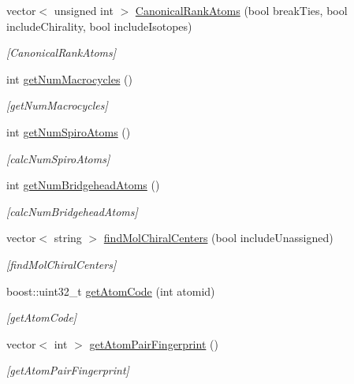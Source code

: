 \begin{DoxyCompactItemize}
vector$<$ unsigned int $>$ \mbox{\hyperlink{class_molecule_abc491241d48487fac42166ff81c0289c}{Canonical\+Rank\+Atoms}} (bool break\+Ties, bool include\+Chirality, bool include\+Isotopes)
\begin{DoxyCompactList}\small\item\em \mbox{[}Canonical\+Rank\+Atoms\mbox{]} \end{DoxyCompactList}\item 
int \mbox{\hyperlink{class_molecule_a7ae4c6e9458d7874bf43bdfbe079d875}{get\+Num\+Macrocycles}} ()
\begin{DoxyCompactList}\small\item\em \mbox{[}get\+Num\+Macrocycles\mbox{]} \end{DoxyCompactList}\item 
int \mbox{\hyperlink{class_molecule_ab418ce9c2222f00552c847a14499e282}{get\+Num\+Spiro\+Atoms}} ()
\begin{DoxyCompactList}\small\item\em \mbox{[}calc\+Num\+Spiro\+Atoms\mbox{]} \end{DoxyCompactList}\item 
int \mbox{\hyperlink{class_molecule_a9d22135d69888e8d269ac5384a424f83}{get\+Num\+Bridgehead\+Atoms}} ()
\begin{DoxyCompactList}\small\item\em \mbox{[}calc\+Num\+Bridgehead\+Atoms\mbox{]} \end{DoxyCompactList}\item 
vector$<$ string $>$ \mbox{\hyperlink{class_molecule_af6c321c6236876f4e4a16cc8ff5ddee9}{find\+Mol\+Chiral\+Centers}} (bool include\+Unassigned)
\begin{DoxyCompactList}\small\item\em \mbox{[}find\+Mol\+Chiral\+Centers\mbox{]} \end{DoxyCompactList}\item 
boost\+::uint32\+\_\+t \mbox{\hyperlink{class_molecule_a4123cb22770fc42287562a16affa5ba5}{get\+Atom\+Code}} (int atomid)
\begin{DoxyCompactList}\small\item\em \mbox{[}get\+Atom\+Code\mbox{]} \end{DoxyCompactList}\item 
vector$<$ int $>$ \mbox{\hyperlink{class_molecule_abfb8fda0aff9f7d749257badadd5d6d5}{get\+Atom\+Pair\+Fingerprint}} ()
\begin{DoxyCompactList}\small\item\em \mbox{[}get\+Atom\+Pair\+Fingerprint\mbox{]} \end{DoxyCompactList}\item 

\end{DoxyCompactItemize}
